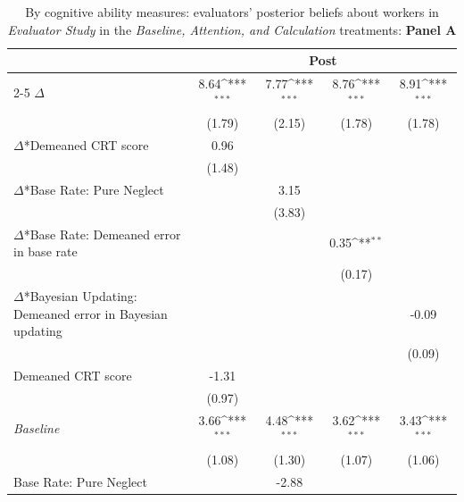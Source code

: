 \begin{table}[htbp]\centering
\def\sym#1{\ifmmode^{#1}\else\(^{#1}\)\fi}
\caption{By cognitive ability measures: evaluators' posterior beliefs about workers in \textit{Evaluator Study} in the \textit{Baseline, Attention, and Calculation} treatments: \textbf{Panel A}}
\begin{tabular}{l*{4}{c}}
\hline\hline
                &\multicolumn{4}{c}{Post}                                                   \\\cmidrule(lr){2-5}
\hline
$\Delta$        &     8.64\sym{***}&     7.77\sym{***}&     8.76\sym{***}&     8.91\sym{***}\\
                &   (1.79)         &   (2.15)         &   (1.78)         &   (1.78)         \\
$\Delta$*Demeaned CRT score&     0.96         &                  &                  &                  \\
                &   (1.48)         &                  &                  &                  \\
$\Delta$*Base Rate: Pure Neglect&                  &     3.15         &                  &                  \\
                &                  &   (3.83)         &                  &                  \\
$\Delta$*Base Rate: Demeaned error in base rate&                  &                  &     0.35\sym{**} &                  \\
                &                  &                  &   (0.17)         &                  \\
$\Delta$*Bayesian Updating: Demeaned error in Bayesian updating&                  &                  &                  &    -0.09         \\
                &                  &                  &                  &   (0.09)         \\
Demeaned CRT score&    -1.31         &                  &                  &                  \\
                &   (0.97)         &                  &                  &                  \\
\textit{Baseline}&     3.66\sym{***}&     4.48\sym{***}&     3.62\sym{***}&     3.43\sym{***}\\
                &   (1.08)         &   (1.30)         &   (1.07)         &   (1.06)         \\
Base Rate: Pure Neglect&                  &    -2.88         &                  &                  \\

\end{tabular}
\end{table}

